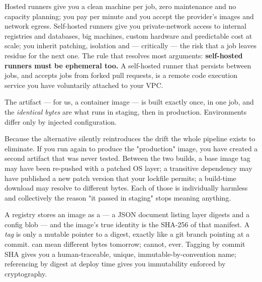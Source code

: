 \begin{tradeoff}
Hosted runners give you a clean machine per job, zero maintenance and no capacity planning; you pay per minute and you accept the provider's images and network egress. Self-hosted runners give you private-network access to internal registries and databases, big machines, custom hardware and predictable cost at scale; you inherit patching, isolation and --- critically --- the risk that a job leaves residue for the next one. The rule that resolves most arguments: \textbf{self-hosted runners must be ephemeral too.} A self-hosted runner that persists between jobs, and accepts jobs from forked pull requests, is a remote code execution service you have voluntarily attached to your VPC.
\end{tradeoff}


 The artifact --- for us, a container image --- is built exactly once, in one job, and the \emph{identical bytes} are what runs in staging, then in production. Environments differ only by injected configuration.

 Because the alternative silently reintroduces the drift the whole pipeline exists to eliminate. If you run  again to produce the "production" image, you have created a second artifact that was never tested. Between the two builds, a base image tag may have been re-pushed with a patched OS layer; a transitive dependency may have published a new patch version that your lockfile permits; a build-time download may resolve to different bytes. Each of those is individually harmless and collectively the reason "it passed in staging" stops meaning anything.

 A registry stores an image as a  --- a JSON document listing layer digests and a config blob --- and the image's true identity is the SHA-256  of that manifest. A \emph{tag} is only a mutable pointer to a digest, exactly like a git branch pointing at a commit.  can mean different bytes tomorrow;  cannot, ever. Tagging by commit SHA gives you a human-traceable, unique, immutable-by-convention name; referencing by digest at deploy time gives you immutability enforced by cryptography.

